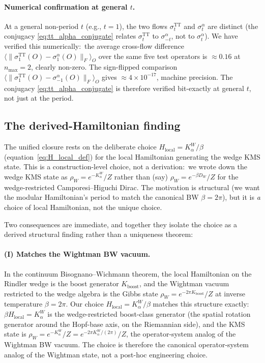 \documentclass[11pt,a4paper]{article}
\theoremstyle{plain}
\theoremstyle{definition}
\newcommand{\nmax}{n_{\max}}
\newcommand{\Frob}[1]{\lVert #1 \rVert_{F}}
\newcommand{\TT}{\mathrm{TT}}
\begin{document}
\paragraph{Numerical confirmation at general $t$.}
At a general non-period $t$ (e.g., $t = 1$), the two flows
$\sigma_t^{\TT}$ and $\sigma_t^{\alpha}$ are distinct (the conjugacy
\eqref{eq:tt_alpha_conjugate} relates $\sigma_t^{\TT}$ to
$\sigma_{-t}^{\alpha}$, not to $\sigma_t^{\alpha}$). We have verified
this numerically:\ the average cross-flow difference
$\langle \Frob{\sigma_1^{\TT}(O) - \sigma_1^{\alpha}(O)} \rangle_O$
over the same five test operators is $\approx 0.16$ at $\nmax = 2$,
clearly non-zero. The sign-flipped comparison
$\langle \Frob{\sigma_1^{\TT}(O) - \sigma_{-1}^{\alpha}(O)} \rangle_O$
gives $\approx 4 \times 10^{-17}$, machine precision. The conjugacy
\eqref{eq:tt_alpha_conjugate} is therefore verified bit-exactly at
general $t$, not just at the period.

\subsection{The derived-Hamiltonian finding}
\label{sec:derived_hamiltonian}

The unified closure rests on the deliberate choice
$H_{\mathrm{local}} = K_\alpha^W / \beta$
(equation~\eqref{eq:H_local_def}) for the local Hamiltonian
generating the wedge KMS state. This is a construction-level choice,
not a derivation:\ we wrote down the wedge KMS state as $\rho_W =
e^{-K_\alpha^W}/Z$ rather than (say) $\rho_W = e^{-\beta D_W}/Z$ for
the wedge-restricted Camporesi--Higuchi Dirac. The motivation is
structural (we want the modular Hamiltonian's period to match the
canonical BW $\beta = 2\pi$), but it is \emph{a} choice of local
Hamiltonian, not the unique choice.

Two consequences are immediate, and together they isolate the choice
as a derived structural finding rather than a uniqueness theorem:

\paragraph{(I) Matches the Wightman BW vacuum.}
In the continuum Bisognano--Wichmann theorem, the local Hamiltonian
on the Rindler wedge is the boost generator $K_{\mathrm{boost}}$, and
the Wightman vacuum restricted to the wedge algebra is the Gibbs state
$\rho_W = e^{-2\pi K_{\mathrm{boost}}}/Z$ at inverse temperature
$\beta = 2\pi$. Our choice $H_{\mathrm{local}} = K_\alpha^W / \beta$
matches this structure exactly:\ $\beta H_{\mathrm{local}} = K_\alpha^W$
is the wedge-restricted boost-class generator (the spatial rotation
generator around the Hopf-base axis, on the Riemannian side), and the
KMS state is $\rho_W = e^{-K_\alpha^W}/Z = e^{-2\pi K_\alpha^W/(2\pi)}/Z$,
the operator-system analog of the Wightman BW vacuum. The choice is
therefore the canonical operator-system analog of the Wightman state,
not a post-hoc engineering choice.
\end{document}
